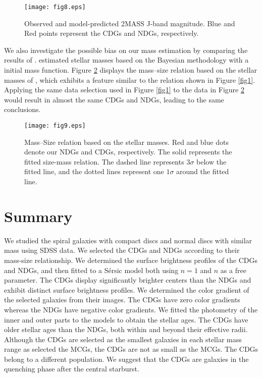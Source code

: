 \documentclass[fleqn,usenatbib]{mnras}
\begin{document}
\begin{figure}
       \texttt{[image: fig8.eps]}
    \caption{
    Observed and model-predicted 2MASS J-band magnitude.
    Blue and Red points represent the CDGs and NDGs, respectively.
    }
    \label{fig8}
\end{figure}

We also investigate the possible bias on our mass estimation by comparing the results of \cite{2003MNRAS.341...33K}.
\citet{2003MNRAS.341...33K} estimated stellar masses based on the Bayesian methodology with a \citet{2001MNRAS.322..231K} initial mass function.
Figure \ref{fig9} displays the mass--size relation based on the stellar masses of \citet{2003MNRAS.341...33K}, which exhibits a feature similar to the relation shown in Figure \ref{fig1}.
Applying the same data selection used in Figure \ref{fig1} to the data in Figure \ref{fig9} would result in almost the same CDGs and NDGs, leading to the same conclusions.

\begin{figure}
       \texttt{[image: fig9.eps]}
    \caption{
    Mass--Size relation based on the \citet{2003MNRAS.341...33K} stellar masses.
    Red and blue dots denote our NDGs and CDGs, respectively.
    The solid represents the fitted size-mass relation.
    The dashed line represents $3\sigma$ below the fitted line, and the dotted lines represent one $1\sigma$ around the fitted line.}
    \label{fig9}
\end{figure}

\section{Summary}

We studied the spiral galaxies with compact discs and normal discs with similar mass using SDSS data.
We selected the CDGs and NDGs according to their mass-size relationship.
We determined the surface brightness profiles of the CDGs and NDGs, and then fitted to a S{\'e}rsic model both using $n=1$ and $n$ as a free parameter.
The CDGs display significantly brighter centers than the NDGs and exhibit distinct surface brightness profiles.
We determined the color gradient of the selected galaxies from their images.
The CDGs have zero color gradients whereas the NDGs have negative color gradients.
We fitted the photometry of the inner and outer parts to the \citet{2003MNRAS.344.1000B} models to obtain the stellar ages.
The CDGs have older stellar ages than the NDGs, both within and beyond their effective radii.
Although the CDGs are selected as the smallest galaxies in each stellar mass range as \citet{2021MNRAS.507..300S} selected the MCGs, the CDGs are not as small as the MCGs.
The CDGs belong to a different population.
We suggest that the CDGs are galaxies in the quenching phase after the central starburst.
\end{document}
